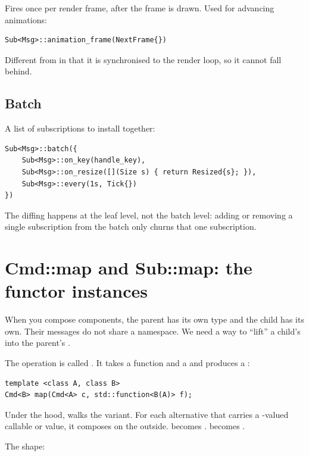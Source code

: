 Fires once per render frame, after the frame is drawn. Used for
advancing animations:

\begin{lstlisting}
Sub<Msg>::animation_frame(NextFrame{})
\end{lstlisting}

Different from  in that it is synchronised to the
render loop, so it cannot fall behind.

\subsection*{Batch}

A list of subscriptions to install together:

\begin{lstlisting}
Sub<Msg>::batch({
    Sub<Msg>::on_key(handle_key),
    Sub<Msg>::on_resize([](Size s) { return Resized{s}; }),
    Sub<Msg>::every(1s, Tick{})
})
\end{lstlisting}

The diffing happens at the leaf level, not the batch level: adding
or removing a single subscription from the batch only churns that
one subscription.

\section{Cmd::map and Sub::map: the functor instances}

When you compose components, the parent has its own 
type and the child has its own. Their messages do not share a
namespace. We need a way to ``lift'' a child's 
into the parent's .

The operation is called . It takes a function
 and a  and
produces a :

\begin{lstlisting}
template <class A, class B>
Cmd<B> map(Cmd<A> c, std::function<B(A)> f);
\end{lstlisting}

Under the hood,  walks the variant. For each alternative
that carries a -valued callable or value, it composes
 on the outside.  becomes
.  becomes
.

The shape:

